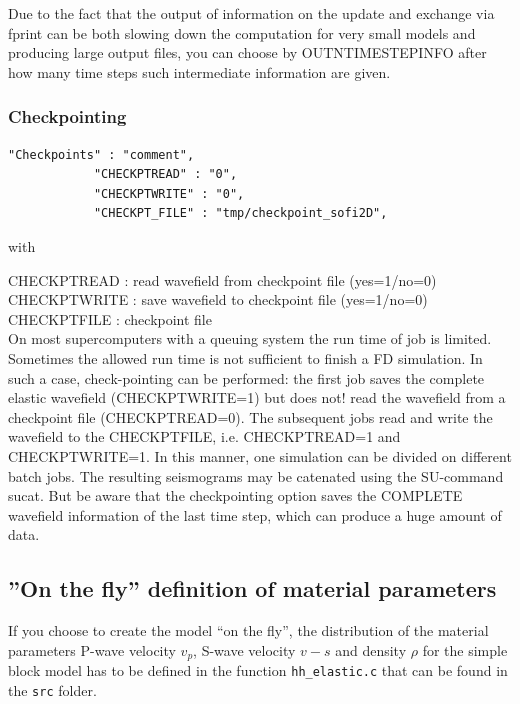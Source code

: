 \documentclass[11pt,onecolumn,oneside]{article}
\begin{document}
Due to the fact that the output of information on the update and exchange via fprint can be both slowing down the computation for very small models and producing large output files, you can choose by OUTNTIMESTEPINFO after how many time steps such intermediate information are given.

\subsubsection{Checkpointing}
\begin{verbatim}
"Checkpoints" : "comment",
			"CHECKPTREAD" : "0",
			"CHECKPTWRITE" : "0",
			"CHECKPT_FILE" : "tmp/checkpoint_sofi2D",
\end{verbatim}

with

CHECKPTREAD : read wavefield from checkpoint file (yes=1/no=0)\\
CHECKPTWRITE : save wavefield to checkpoint file (yes=1/no=0)\\
CHECKPTFILE : checkpoint file\\


On most supercomputers with a queuing system the run time of job is limited. Sometimes the allowed run time is not sufficient to finish a FD simulation. In such a case, check-pointing can be performed: the first job saves the complete elastic wavefield (CHECKPTWRITE=1) but does not! read the wavefield from a checkpoint file (CHECKPTREAD=0). The subsequent jobs read and write the wavefield to the CHECKPTFILE, i.e. CHECKPTREAD=1 and CHECKPTWRITE=1. In this manner, one simulation can be divided on different batch jobs. The resulting seismograms may be catenated using the SU-command sucat. But be aware that the checkpointing option saves the COMPLETE wavefield information of the last time step, which can produce a huge amount of data.

\subsection{''On the fly'' definition of material parameters}
\label{model_def_func}
If you choose to create the model ``on the fly'', the distribution of the material parameters P-wave velocity $v_p$, S-wave velocity $v-s$ and density $\rho$ for the simple block model has to be defined in the function \texttt{hh\_elastic.c} that can be found in the \texttt{src} folder.
\end{document}
